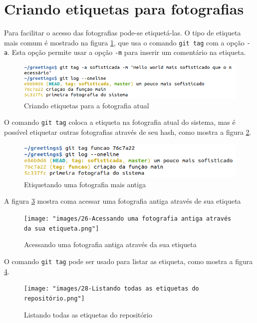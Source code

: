 \documentclass[a4paper]{book}
\begin{document}
\section{Criando etiquetas para fotografias}

Para facilitar o acesso das fotografias pode-se etiquetá-las.
O tipo de etiqueta mais comum é mostrado na figura
\ref{fig:23}, que usa o comando \texttt{git tag} com a
opção \texttt{-a}. Esta opção permite usar a opção 
\texttt{-m} para inserir um comentário na etiqueta.

\begin{figure}[ht]
\caption{Criando etiquetas para a fotografia atual}
\label{fig:23}
\centering
\includegraphics[scale=0.6]{"images/23-Criando etiquetas para a fotografia atual.png"}
\end{figure}

O comando \texttt{git tag} coloca a etiqueta na fotografia atual
do sistema, mas é possível etiquetar outras fotografias 
através de seu hash, como mostra a figura \ref{fig:25}.

\begin{figure}[h!]
\caption{Etiquetando uma fotografia mais antiga}
\label{fig:25}
\centering
\includegraphics[scale=0.6]{"images/25-Etiquetando uma fotografia mais antiga.png"}
\end{figure}

A figura \ref{fig:26} mostra coma acessar uma fotografia antiga 
através de sua etiqueta

\begin{figure}[h!]
\caption{Acessando uma fotografia antiga através da sua etiqueta}
\label{fig:26}
\centering
\texttt{[image: "images/26-Acessando uma fotografia antiga através da sua etiqueta.png"]}
\end{figure}

O comando \texttt{git tag} pode ser usado para listar as
etiqueta, como mostra a figura \ref{fig:28}.

\begin{figure}[h!]
\caption{Listando todas as etiquetas do repositório}
\label{fig:28}
\centering
\texttt{[image: "images/28-Listando todas as etiquetas do repositório.png"]}
\end{figure}
\end{document}
